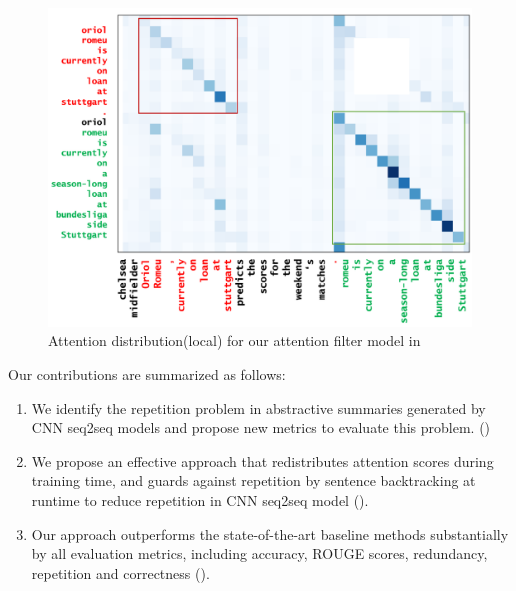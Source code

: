 {\begin{figure}[th!]
\centering
\includegraphics[width=0.9\linewidth]{map3}
\caption{Attention distribution(local) for our attention filter model in }
\label{fig:attn_map3}
\end{figure}
}%

Our contributions are summarized as follows:
\begin{enumerate}
\item We identify the repetition problem in abstractive summaries generated
by CNN seq2seq models and propose new metrics to evaluate this problem. ()
\item We propose an effective approach that redistributes attention scores 
during training time, and guards against repetition by sentence backtracking
at runtime to reduce repetition in CNN seq2seq model ().
\item Our approach outperforms the state-of-the-art baseline methods 
substantially by all evaluation metrics, including accuracy, ROUGE scores, 
redundancy, repetition and correctness ().
\end{enumerate}

